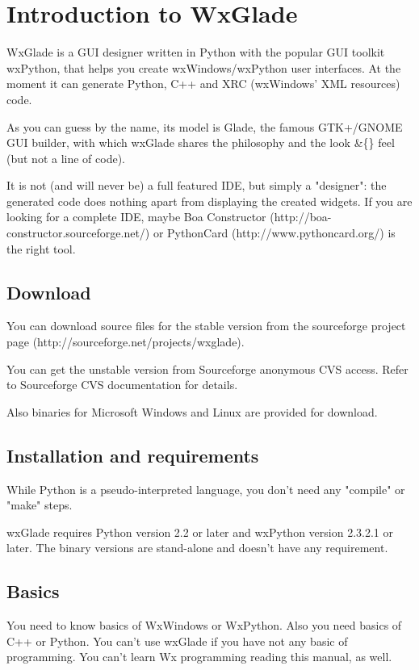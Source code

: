 \documentclass[a4paper,10pt]{report}
\begin{document}
  \chapter{Introduction to WxGlade}
  WxGlade is a GUI designer written in Python with the popular
  GUI toolkit wxPython, that helps you create wxWindows/wxPython
  user interfaces. At the moment it can generate Python, C++ and
  XRC (wxWindows' XML resources) code.

  As you can guess by the name, its model is Glade, the famous
  GTK+/GNOME GUI builder, with which wxGlade shares the philosophy
  and the look \&\{\} feel (but not a line of code).



  It is not (and will never be) a full featured IDE, but simply
  a "designer": the generated code does nothing apart from displaying
  the created widgets. If you are looking for a complete IDE,
  maybe Boa Constructor (http://boa-constructor.sourceforge.net/)
  or PythonCard (http://www.pythoncard.org/) is the right tool.



  \section{Download}
  You can download source files for the stable version from the
  sourceforge project page (http://sourceforge.net/projects/wxglade).


  You can get the unstable version from Sourceforge anonymous CVS
  access. Refer to Sourceforge CVS documentation for details.


  Also binaries for Microsoft Windows and Linux are provided for
  download.

  \section{Installation and requirements}


  While Python is a pseudo-interpreted language, you don't need
  any "compile" or "make" steps.


  wxGlade requires Python version 2.2 or later and wxPython version
  2.3.2.1 or later.
  The binary versions are stand-alone and doesn't have any requirement.
  \section{Basics}

  You need to know basics of WxWindows or WxPython.
  Also you need basics of C++ or Python.
  You can't use wxGlade if you have not any basic of programming.
  You can't learn Wx programming reading this manual, as well.
\end{document}

